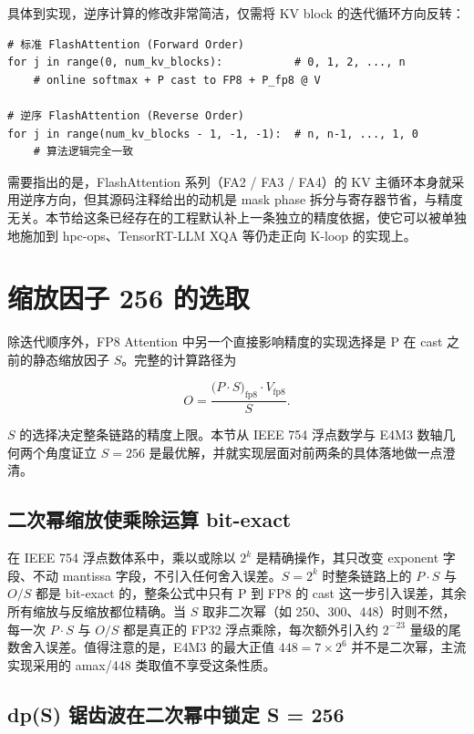 具体到实现，逆序计算的修改非常简洁，仅需将 KV block 的迭代循环方向反转：

\begin{lstlisting}
# 标准 FlashAttention (Forward Order)
for j in range(0, num_kv_blocks):           # 0, 1, 2, ..., n
    # online softmax + P cast to FP8 + P_fp8 @ V

# 逆序 FlashAttention (Reverse Order)
for j in range(num_kv_blocks - 1, -1, -1):  # n, n-1, ..., 1, 0
    # 算法逻辑完全一致
\end{lstlisting}

需要指出的是，FlashAttention 系列（FA2 / FA3 / FA4）的 KV 主循环本身就采用逆序方向，但其源码注释给出的动机是 mask phase 拆分与寄存器节省，与精度无关。本节给这条已经存在的工程默认补上一条独立的精度依据，使它可以被单独地施加到 hpc-ops、TensorRT-LLM XQA 等仍走正向 K-loop 的实现上。

\section{缩放因子 256 的选取}

除迭代顺序外，FP8 Attention 中另一个直接影响精度的实现选择是 P 在 cast 之前的静态缩放因子 $S$。完整的计算路径为

\begin{equation*}
O = \frac{\big(P \cdot S\big)_{\text{fp8}} \cdot V_{\text{fp8}}}{S}.
\end{equation*}

$S$ 的选择决定整条链路的精度上限。本节从 IEEE 754 浮点数学与 E4M3 数轴几何两个角度证立 $S = 256$ 是最优解，并就实现层面对前两条的具体落地做一点澄清。

\subsection{二次幂缩放使乘除运算 bit-exact}

在 IEEE 754 浮点数体系中，乘以或除以 $2^k$ 是精确操作，其只改变 exponent 字段、不动 mantissa 字段，不引入任何舍入误差。$S = 2^k$ 时整条链路上的 $P \cdot S$ 与 $O / S$ 都是 bit-exact 的，整条公式中只有 P 到 FP8 的 cast 这一步引入误差，其余所有缩放与反缩放都位精确。当 $S$ 取非二次幂（如 250、300、448）时则不然，每一次 $P \cdot S$ 与 $O / S$ 都是真正的 FP32 浮点乘除，每次额外引入约 $2^{-23}$ 量级的尾数舍入误差。值得注意的是，E4M3 的最大正值 $448 = 7 \times 2^6$ 并不是二次幂，主流实现采用的 amax/448 类取值不享受这条性质。

\subsection{dp(S) 锯齿波在二次幂中锁定 S = 256}

